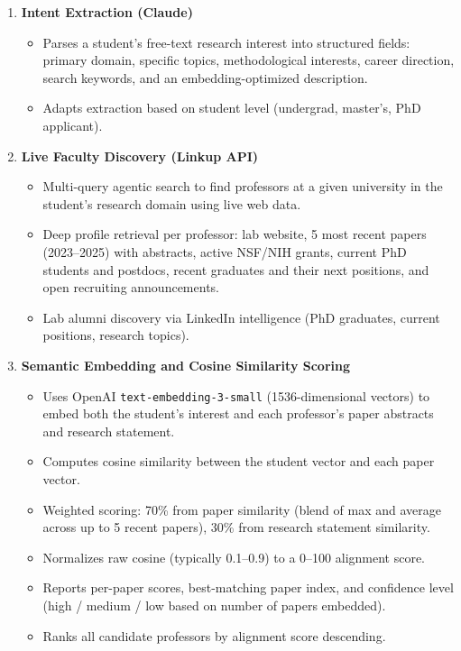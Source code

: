 \documentclass{article}
\begin{document}
\begin{enumerate}[label=\textbf{\arabic*.}]

  \item \textbf{Intent Extraction (Claude)}
    \begin{itemize}
      \item Parses a student's free-text research interest into structured fields:
            primary domain, specific topics, methodological interests, career direction,
            search keywords, and an embedding-optimized description.
      \item Adapts extraction based on student level (undergrad, master's, PhD applicant).
    \end{itemize}

  \item \textbf{Live Faculty Discovery (Linkup API)}
    \begin{itemize}
      \item Multi-query agentic search to find professors at a given university
            in the student's research domain using live web data.
      \item Deep profile retrieval per professor: lab website, 5 most recent papers
            (2023--2025) with abstracts, active NSF/NIH grants, current PhD students
            and postdocs, recent graduates and their next positions, and open
            recruiting announcements.
      \item Lab alumni discovery via LinkedIn intelligence (PhD graduates,
            current positions, research topics).
    \end{itemize}

  \item \textbf{Semantic Embedding and Cosine Similarity Scoring}
    \begin{itemize}
      \item Uses OpenAI \texttt{text-embedding-3-small} (1536-dimensional vectors)
            to embed both the student's interest and each professor's paper abstracts
            and research statement.
      \item Computes cosine similarity between the student vector and each paper vector.
      \item Weighted scoring: 70\% from paper similarity (blend of max and average
            across up to 5 recent papers), 30\% from research statement similarity.
      \item Normalizes raw cosine (typically 0.1--0.9) to a 0--100 alignment score.
      \item Reports per-paper scores, best-matching paper index, and confidence level
            (high / medium / low based on number of papers embedded).
      \item Ranks all candidate professors by alignment score descending.
    \end{itemize}


\end{enumerate}
\end{document}
